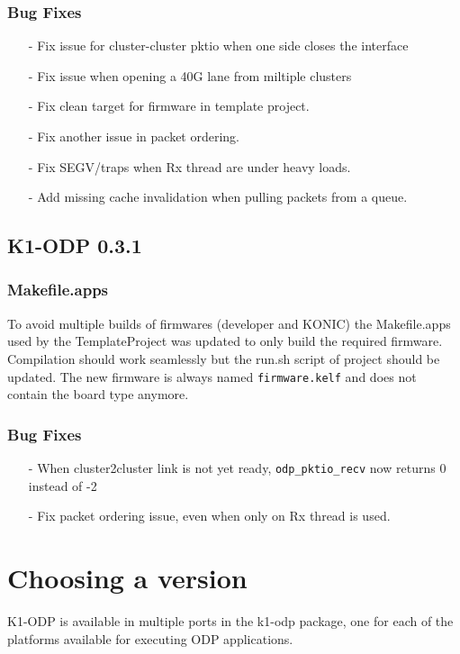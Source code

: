 \documentclass{trkalray}
\begin{document}
\subsubsection{Bug Fixes}
\begin{itemize}
\item[-]{Fix issue for cluster-cluster pktio when one side closes the
  interface}
\item[-]{Fix issue when opening a 40G lane from miltiple clusters}
\item[-]{Fix clean target for firmware in template project.}
\item[-]{Fix another issue in packet ordering.}
\item[-]{Fix SEGV/traps when Rx thread are under heavy loads.}
\item[-]{Add missing cache invalidation when pulling packets from a queue.}
\end{itemize}

\subsection{K1-ODP 0.3.1}

\subsubsection{Makefile.apps}

To avoid multiple builds of firmwares (developer and KONIC) the
Makefile.apps used by the TemplateProject was updated to only build
the required firmware.
Compilation should work seamlessly but the run.sh script of project
should be updated.
The new firmware is always named \texttt{firmware.kelf} and does not
contain the board type anymore.

\subsubsection{Bug Fixes}

\begin{itemize}
\item[-]{When cluster2cluster link is not yet ready, \texttt{odp\_pktio\_recv}
now returns 0 instead of -2}
\item[-]{Fix packet ordering issue, even when only on Rx thread is used.}
\end{itemize}

\section{Choosing a version}
K1-ODP is available in multiple ports in the k1-odp package, one for
each of the platforms available for executing ODP applications.
\end{document}
